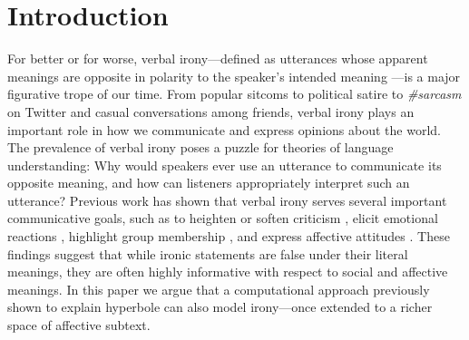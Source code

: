 \documentclass[10pt,letterpaper]{article}
\begin{document}
\section{Introduction}
For better or for worse, verbal irony---defined as utterances whose apparent meanings are opposite in polarity to the speaker's intended meaning \cite{roberts1994people, colston2000contrast}---is a major figurative trope of our time. From popular sitcoms to political satire to \emph{\#sarcasm} on Twitter and casual conversations among friends, verbal irony plays an important role in how we communicate and express  opinions about the world. The prevalence of verbal irony poses a puzzle for theories of language understanding: Why would speakers ever use an utterance to communicate its opposite meaning, and how can listeners appropriately interpret such an utterance? Previous work has shown that verbal irony serves several important communicative goals, such as to heighten or soften criticism \cite{colston1997salting}, elicit emotional reactions \cite{leggitt2000emotional}, highlight group membership \cite{gibbs2000irony}, and express affective attitudes \cite{colston1998you, colston1997ve}. These findings suggest that while ironic statements are false under their literal meanings, they are often highly informative with respect to social and affective meanings. 
In this paper we argue that a computational approach previously shown to explain hyperbole \cite{kao2014nonliteral} can also model irony---once extended to a richer space of affective subtext. 

\end{document}
